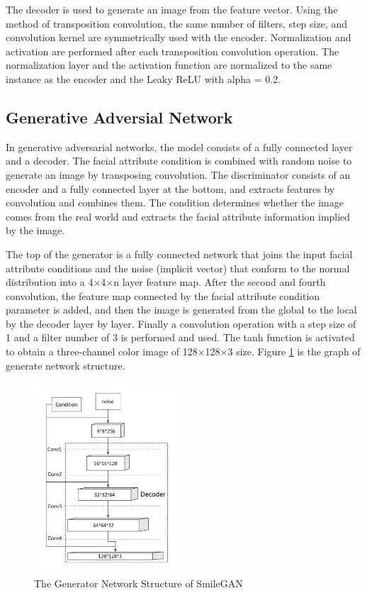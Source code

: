 The decoder is used to generate an image from the feature vector.
Using the method of transposition convolution, the same number of filters,
    step size, and convolution kernel are symmetrically used with the encoder.
Normalization and activation are performed after each transposition convolution operation.
The normalization layer and the activation function are normalized to the same instance as the encoder and the Leaky ReLU with alpha = 0.2.


\subsection{Generative Adversial Network}

In generative adversarial networks, the model consists of a fully connected layer and a decoder.
The facial attribute condition is combined with random noise to generate an image by transposing convolution.
The discriminator consists of an encoder and a fully connected layer at the bottom,
    and extracts features by convolution and combines them.
The condition determines whether the image comes from the real world and extracts the facial attribute information implied by the image.

The top of the generator is a fully connected network that joins the input facial attribute conditions and the noise (implicit vector) that conform to the normal distribution into a 4×4×n layer feature map.
After the second and fourth convolution, the feature map connected by the facial attribute condition parameter is added,
    and then the image is generated from the global to the local by the decoder layer by layer.
Finally a convolution operation with a step size of 1 and a filter number of 3 is performed and used.
The tanh function is activated to obtain a three-channel color image of 128×128×3 size.
Figure \ref{net_generator} is the graph of generate network structure.

\begin{figure}
    \begin{center}
    \includegraphics[width=0.48\textwidth]{figures/net_generator.pdf}
    \caption{The Generator Network Structure of SmileGAN}
    \label{net_generator}
    \end{center}
\end{figure}

